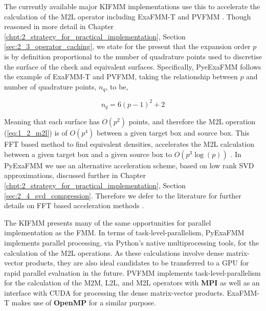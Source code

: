 The currently available major \gls{KIFMM} implementations use this to accelerate the calculation of the
\gls{M2L} operator including ExaFMM-T and PVFMM \cite{Malhotra:2015:CCP, exafmm}.  Though
reasoned in more detail in Chapter \ref{chpt:2_strategy_for_practical_implementation}, Section \ref{sec:2_3_operator_caching}, we state for
the present that the expansion order $p$ is by definition proportional to the
number of quadrature points used to discretise the surface of the check and
equivalent surfaces. Specifically, PyeExaFMM follows the example of ExaFMM-T and
PVFMM, taking the relationship between $p$ and number of quadrature points, $n_q$,
to be,

\begin{equation}
    n_q = 6(p-1)^2 + 2
\end{equation}

Meaning that each surface has $O(p^2)$ points, and therefore the \gls{M2L} operation
(\ref{eq:1_2_m2l}) is of $O(p^4)$ between a given target box and source box.
This \gls{FFT} based method to find equivalent densities, accelerates the \gls{M2L} calculation between a given target box
and a given source box to $O(p^3 \log(p))$ \cite{Ying:2004:JCP}. In PyExaFMM we use an alternative
acceleration scheme, based on low rank SVD approximations, discussed further in
Chapter \ref{chpt:2_strategy_for_practical_implementation}, Section \ref{sec:2_4_svd_compression}. Therefore we defer to the
literature for further details on FFT based acceleration methods \cite{Ying:2004:JCP, Malhotra:2015:CCP}.

The \gls{KIFMM} presents many of the same opportunities for parallel implementation
as the \gls{FMM}. In terms of \gls{task-level-parallelism}, PyExaFMM implements
parallel processing, via Python's native multiprocessing tools, for the calculation
of the \gls{M2L} operations. As these calculations involve dense matrix-vector products,
they are also ideal candidates to be transferred
to a \gls{GPU} for rapid parallel evaluation in the future. PVFMM implements
\gls{task-level-parallelism} for the calculation of the M2M, L2L, and M2L
operators with \textbf{\gls{MPI}} as well as an interface with \gls{CUDA} for
processing the dense matrix-vector products. ExaFMM-T makes use of
\textbf{\gls{OpenMP}} for a similar purpose.

